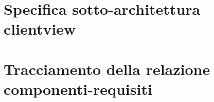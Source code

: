 \clearpage

\section{Specifica sotto-architettura clientview}\label{sec:clientviewarchitecture}

\clearpage

\section{Tracciamento della relazione componenti-requisiti}



